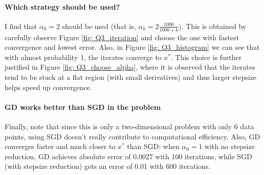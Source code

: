 \documentclass{article}
\begin{document}
\paragraph{Which strategy should be used?} I find that $ \alpha_0 =2 $ should be used (that is, $ \alpha_k =2 \frac{1000}{1000+k} $). This is obtained by carefully observe Figure \ref{fig: Q3_iteration} and choose the one with fastest convergence and lowest error. Also, in Figure \ref{fig: Q3_histogram} we can see that with almost probability 1, the iterates converge to $ x^{*} $. This choice is further justified in Figure \ref{fig: Q3_choose_alpha}, where it is observed that the iterates tend to be stuck at a flat region (with small derivatives) and thus larger stepsize helps speed up convergence.

\paragraph{GD works better than SGD in the problem} Finally, note that since this is only a two-dimensional problem with only 6 data points, using SGD doesn't really contribute to computational efficiency. Also, GD converges faster and much closer to $ x^{*} $ than SGD: when $ \alpha_0 =1 $ with no stepsize reduction, GD achieves absolute error of 0.0027 with 100 iterations, while SGD (with stepsize reduction) gets an error of 0.01 with 600 iterations. 
\end{document}
